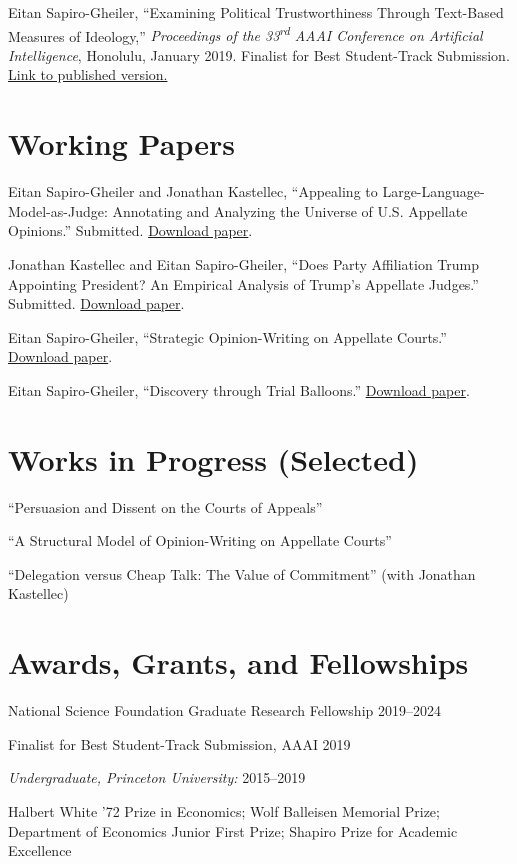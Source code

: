 \documentclass[11pt,reqno]{amsart}
\begin{document}
Eitan Sapiro-Gheiler, ``Examining Political Trustworthiness Through Text-Based Measures of Ideology,'' \textit{Proceedings of the 33\textsuperscript{rd} AAAI Conference on Artificial Intelligence}, Honolulu, January 2019. Finalist for Best Student-Track Submission. \href{https://ojs.aaai.org/index.php/AAAI/article/view/5151}{Link to published version.}

\section*{Working Papers}
Eitan Sapiro-Gheiler and Jonathan Kastellec, ``Appealing to Large-Language-Model-as-Judge: Annotating and Analyzing the Universe of U.S. Appellate Opinions.'' Submitted. \href{https://eitansg.github.io/files/papers/llm_appeals.pdf}{Download paper}.

Jonathan Kastellec and Eitan Sapiro-Gheiler, ``Does Party Affiliation Trump Appointing President? An Empirical Analysis of Trump's Appellate Judges.'' Submitted. \href{https://eitansg.github.io/files/papers/trump.pdf}{Download paper}.

Eitan Sapiro-Gheiler, ``Strategic Opinion-Writing on Appellate Courts.'' \href{https://eitansg.github.io/files/papers/strat_op.pdf}{Download paper}.

Eitan Sapiro-Gheiler, ``Discovery through Trial Balloons.'' \href{https://arxiv.org/abs/2211.02743}{Download paper}.

\section*{Works in Progress (Selected)}
``Persuasion and Dissent on the Courts of Appeals''

``A Structural Model of Opinion-Writing on Appellate Courts''

``Delegation versus Cheap Talk: The Value of Commitment'' (with Jonathan Kastellec)

\section*{Awards, Grants, and Fellowships}
National Science Foundation Graduate Research Fellowship \hfill 2019--2024

Finalist for Best Student-Track Submission, AAAI \hfill 2019

\textit{Undergraduate, Princeton University:} \hfill 2015--2019\\
\parbox[t]{0.7\textwidth}{Halbert White '72 Prize in Economics; Wolf Balleisen Memorial Prize; Department of Economics Junior First Prize; Shapiro Prize for Academic Excellence}\par\prevdepth=0pt
\end{document}
